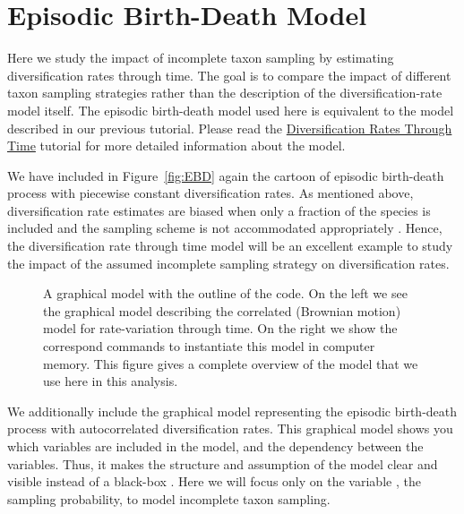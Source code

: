 \bigskip
\section{Episodic Birth-Death Model}

Here we study the impact of incomplete taxon sampling by estimating diversification rates through time.
The goal is to compare the impact of different taxon sampling strategies rather than the description of the diversification-rate model itself.
The episodic birth-death model used here is equivalent to the model described in our previous tutorial.
Please read the \href{https://github.com/revbayes/revbayes_tutorial/raw/master/tutorial_TeX/RB_DiversificationRate_Episodic_Tutorial/RB_DiversificationRate_Episodic_Tutorial.pdf}{Diversification Rates Through Time} tutorial for more detailed information about the model.

We have included in Figure~\ref{fig:EBD} again the cartoon of episodic birth-death process with piecewise constant diversification rates.
As mentioned above, diversification rate estimates are biased when only a fraction of the species is included and the sampling scheme is not accommodated appropriately \citep{Cusimano2010,Hoehna2011,Cusimano2012,Hoehna2014a}.
Hence, the diversification rate through time model will be an excellent example to study the impact of the assumed incomplete sampling strategy on diversification rates.

\begin{figure}[h!]
\centering
{}
\caption{\small A graphical model with the outline of the \Rev code. On the left we see the graphical model describing the correlated (Brownian motion) model for rate-variation through time. On the right we show the correspond \Rev commands to instantiate this model in computer memory. This figure gives a complete overview of the model that we use here in this analysis.}
\label{fig:EBD_GM}
\end{figure}
We additionally include the graphical model representing the episodic birth-death process with autocorrelated diversification rates.
This graphical model shows you which variables are included in the model, and the dependency between the variables.
Thus, it makes the structure and assumption of the model clear and visible instead of a black-box \citep{Hoehna2014b}.
Here we will focus only on the variable , the sampling probability, to model incomplete taxon sampling.


